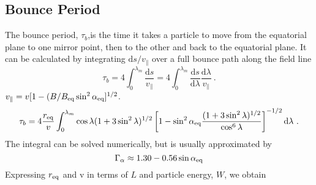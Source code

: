 \documentclass[12pt,a4paper]{article}
\newcommand{\dif}{\mathrm{d}}
\begin{document}
\subsection{Bounce Period}
The bounce period, $\tau_b$,is the time it takes a particle to move from the equatorial plane to one mirror point, then to the other and back to the equatorial plane. It can be calculated by integrating $\dif s/v_\parallel$ over a full bounce path along the field line
\begin{equation}
\tau_b = 4 \int_0^{\lambda_m} \dfrac{\dif s}{v_\parallel} = 4 \int_0^{\lambda_m} \dfrac{\dif s}{\dif \lambda}  \dfrac{\dif \lambda}{v_\parallel} ~.
\end{equation}
$v_\parallel = v [1-(B/B_{\rm eq} \sin^2 \alpha_{\rm eq}]^{1/2}$. 
\begin{equation}
\tau_b = 4 \dfrac{r_{\rm eq} }{v} \int_0^{\lambda_m} \cos \lambda (1+3\sin^2 \lambda)^{1/2} \left[1- \sin^2 \alpha_{\rm eq} \dfrac{(1+3\sin^2 \lambda)^{1/2}}{\cos^6 \lambda} \right]^{-1/2} \dif \lambda ~.
\end{equation}
The integral can be solved numerically, but is usually approximated by
\begin{equation}
\Gamma_\alpha \approx 1.30 - 0.56 \sin \alpha_{\rm eq}
\end{equation}
Expressing $r_{\rm eq}$ and v in terms of $L$ and particle energy, $W$, we obtain
\end{document}

